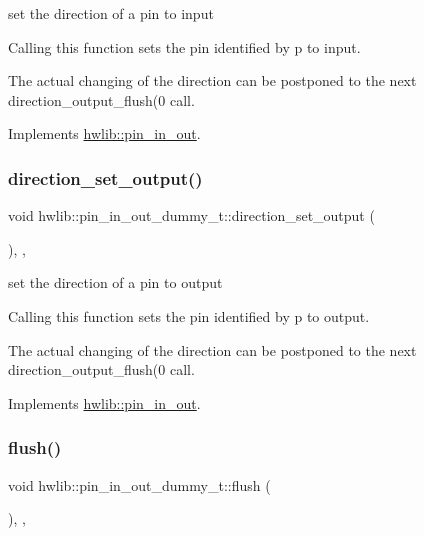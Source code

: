 set the direction of a pin to input

Calling this function sets the pin identified by p to input.

The actual changing of the direction can be postponed to the next direction\+\_\+output\+\_\+flush(0 call. 

Implements \hyperlink{classhwlib_1_1pin__in__out_a54ce1a5086d3c9e7b868511b1d46acd0}{hwlib\+::pin\+\_\+in\+\_\+out}.

\mbox{\label{classhwlib_1_1pin__in__out__dummy__t_a065ca763bd00d4cd6bf3fd11610779db}} 
\subsubsection{\texorpdfstring{direction\+\_\+set\+\_\+output()}{direction\_set\_output()}}
{\footnotesize\ttfamily void hwlib\+::pin\+\_\+in\+\_\+out\+\_\+dummy\+\_\+t\+::direction\+\_\+set\+\_\+output (\begin{DoxyParamCaption}{ }\end{DoxyParamCaption})\hspace{0.3cm}{\ttfamily [inline]}, {\ttfamily [override]}, {\ttfamily [virtual]}}

set the direction of a pin to output

Calling this function sets the pin identified by p to output.

The actual changing of the direction can be postponed to the next direction\+\_\+output\+\_\+flush(0 call. 

Implements \hyperlink{classhwlib_1_1pin__in__out_ad08a5f5e9a4c3aadaa7c665b98f2418e}{hwlib\+::pin\+\_\+in\+\_\+out}.

\mbox{\label{classhwlib_1_1pin__in__out__dummy__t_ab799d24ac3180d3d7e97512410ef9994}} 
\subsubsection{\texorpdfstring{flush()}{flush()}}
{\footnotesize\ttfamily void hwlib\+::pin\+\_\+in\+\_\+out\+\_\+dummy\+\_\+t\+::flush (\begin{DoxyParamCaption}{ }\end{DoxyParamCaption})\hspace{0.3cm}{\ttfamily [inline]}, {\ttfamily [override]}, {\ttfamily [virtual]}}

